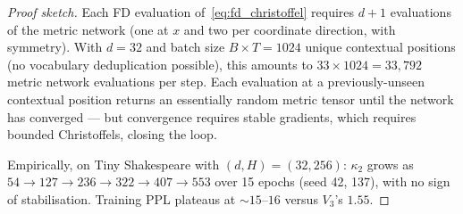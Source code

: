 \documentclass[11pt,letterpaper]{article}
\begin{document}
\begin{proof}[Proof sketch]
Each FD evaluation of~\eqref{eq:fd_christoffel} requires $d+1$ 
evaluations of the metric network (one at $x$ and two per 
coordinate direction, with symmetry). With $d = 32$ and batch size 
$B \times T = 1024$ unique contextual positions (no vocabulary 
deduplication possible), this amounts to $33 \times 1024 = 33{,}792$ 
metric network evaluations per step. Each evaluation at a 
previously-unseen contextual position returns an essentially random 
metric tensor until the network has converged --- but convergence 
requires stable gradients, which requires bounded Christoffels, 
closing the loop.

Empirically, on Tiny Shakespeare with $(d, H) = (32, 256)$: 
$\kappa_2$ grows as $54 \to 127 \to 236 \to 322 \to 407 \to 553$ 
over 15 epochs (seed 42, 137), with no sign of stabilisation. 
Training PPL plateaus at $\sim\!15\text{--}16$ versus $V_3$'s 
$1.55$.
\end{proof}
\end{document}
